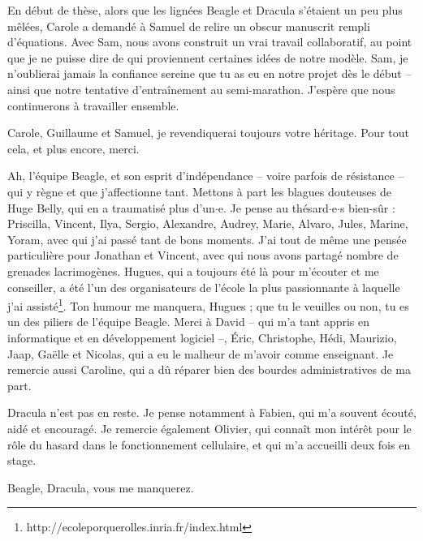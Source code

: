 En d\'ebut de th\`ese, alors que les lign\'ees Beagle et Dracula s'\'etaient un peu plus m\^el\'ees, Carole a demand\'e \`a Samuel de relire un obscur manuscrit rempli d'\'equations. Avec Sam, nous avons construit un vrai travail collaboratif, au point que je ne puisse dire de qui proviennent certaines id\'ees de notre mod\`ele. Sam, je n'oublierai jamais la confiance sereine que tu as eu en notre projet d\`es le d\'ebut -- ainsi que notre tentative d'entra\^inement au semi-marathon. J'esp\`ere que nous continuerons \`a travailler ensemble.

Carole, Guillaume et Samuel, je revendiquerai toujours votre h\'eritage. Pour tout cela, et plus encore, merci.

Ah, l'\'equipe Beagle, et son esprit d'ind\'ependance -- voire parfois de r\'esistance -- qui y r\`egne et que j'affectionne tant. Mettons \`a part les blagues douteuses de Huge Belly, qui en a traumatis\'e plus d'un$\cdot$e. Je pense au th\'esard$\cdot$e$\cdot$s bien-s\^ur : Priscilla, Vincent, Ilya, Sergio, Alexandre, Audrey, Marie, Alvaro, Jules, Marine, Yoram, avec qui j'ai pass\'e tant de bons moments. J'ai tout de m\^eme une pens\'ee particuli\`ere pour Jonathan et Vincent, avec qui nous avons partag\'e nombre de grenades lacrimog\`enes.
Hugues, qui a toujours \'et\'e l\`a pour m'\'ecouter et me conseiller, a \'et\'e l'un des organisateurs de l'\'ecole la plus passionnante \`a laquelle j'ai assist\'e\footnote{http://ecoleporquerolles.inria.fr/index.html}. Ton humour me manquera, Hugues ; que tu le veuilles ou non, tu es un des piliers de l'\'equipe Beagle. Merci \`a David -- qui m'a tant appris en informatique et en d\'eveloppement logiciel --, \'Eric, Christophe, H\'edi, Maurizio, Jaap, Ga\"elle et Nicolas, qui a eu le malheur de m'avoir comme enseignant. Je remercie aussi Caroline, qui a d\^u r\'eparer bien des bourdes administratives de ma part.

Dracula n'est pas en reste. Je pense notamment \`a Fabien, qui m'a souvent \'ecout\'e, aid\'e et encourag\'e. Je remercie \'egalement Olivier, qui conna\^it mon int\'er\^et pour le r\^ole du hasard dans le fonctionnement cellulaire, et qui m'a accueilli deux fois en stage.

Beagle, Dracula, vous me manquerez.

